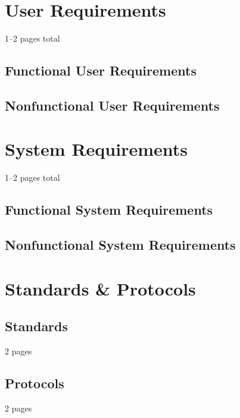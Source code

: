 \begin{chapterpage}
  \minitoc
\end{chapterpage}

\section{User Requirements}
1--2 pages total
\subsection{Functional User Requirements}
\subsection{Nonfunctional User Requirements}

\section{System Requirements}
1--2 pages total
\subsection{Functional System Requirements}
\subsection{Nonfunctional System Requirements}

\section{Standards \& Protocols}
\subsection{Standards}
2 pages
\subsection{Protocols}
2 pages
